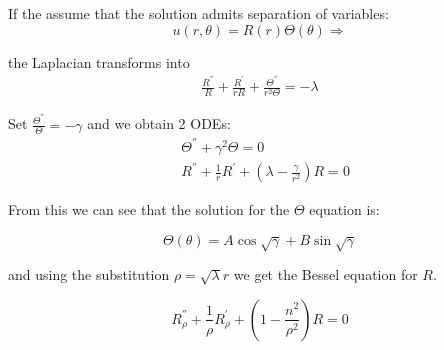 If the assume that the solution admits separation of variables:
\begin{equation}
u(r,\theta) = R(r)\Theta(\theta) \Longrightarrow
\end{equation}

the Laplacian transforms into
\begin{equation}
\begin{split}
\frac{R^{''}}{R} + \frac{R^{'}}{rR} + \frac{\Theta^{''}}{r^2\Theta} = -\lambda
\end{split}
\end{equation}

Set $ \frac{\Theta^{''}}{\Theta} = -\gamma $ and we obtain 2 ODEs:
\begin{equation}
\begin{split}
& \Theta^{''} + \gamma^2\Theta = 0 \\[.8em]
& R^{''} + \frac{1}{r}R^{'} + \left(\lambda - \frac{\gamma}{r^2}\right) R = 0
\end{split}
\end{equation}

From this we can see that the solution for the $ \Theta $ equation is:

\begin{equation}
\Theta(\theta) = A\cos\sqrt{\gamma} + B\sin\sqrt{\gamma}
\end{equation}

and using the substitution $ \rho = \sqrt{\lambda}r $ we get the Bessel equation for $ R $.

\begin{equation}
R^{''}_{\rho} + \frac{1}{\rho}R^{'}_{\rho} + \left(1 - \frac{n^2}{\rho^2}\right)R = 0
\end{equation}



